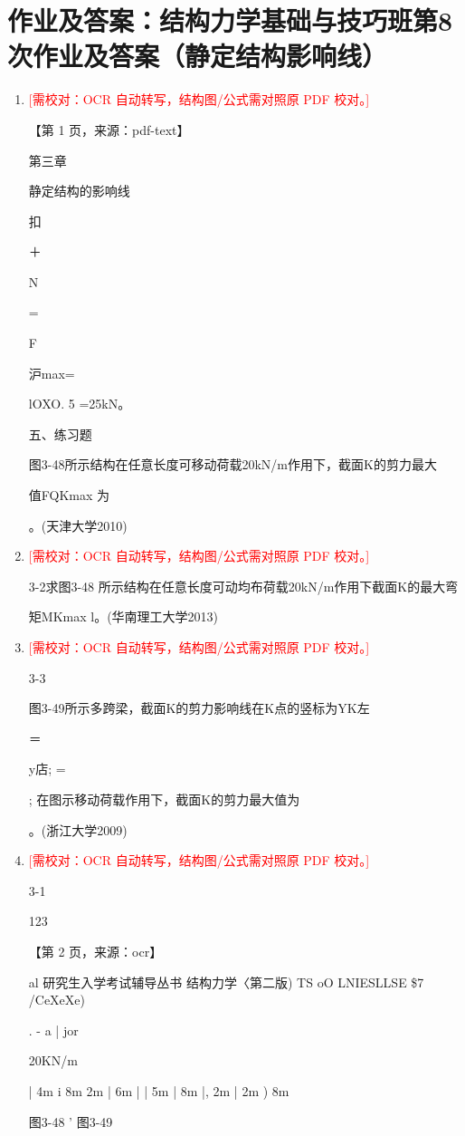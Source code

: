 \documentclass[UTF8,12pt,a4paper,openany]{ctexbook}
\newcommand{\TODO}[1]{\textcolor{red}{[需校对：#1]}}
\begin{document}
\section{作业及答案：结构力学基础与技巧班第8次作业及答案（静定结构影响线）}
\begin{enumerate}[label=\textbf{\arabic*.},leftmargin=2em]
\item \TODO{OCR 自动转写，结构图/公式需对照原 PDF 校对。}\par 【第 1 页，来源：pdf-text】\par 第三章\par 静定结构的影响线\par 扣\par ＋\par N\par =\par F\par 沪max=\par lOXO. 5 =25kN。\par 五、练习题\par 图3-48所示结构在任意长度可移动荷载20kN/m作用下，截面K的剪力最大\par 值FQKmax 为\par 。(天津大学2010)
\item \TODO{OCR 自动转写，结构图/公式需对照原 PDF 校对。}\par 3-2求图3-48 所示结构在任意长度可动均布荷载20kN/m作用下截面K的最大弯\par 矩MKmax l。(华南理工大学2013)
\item \TODO{OCR 自动转写，结构图/公式需对照原 PDF 校对。}\par 3-3\par 图3-49所示多跨梁，截面K的剪力影响线在K点的竖标为YK左\par ＝\par y店; =\par ; 在图示移动荷载作用下，截面K的剪力最大值为\par 。(浙江大学2009)
\item \TODO{OCR 自动转写，结构图/公式需对照原 PDF 校对。}\par 3-1\par 123\par \par 【第 2 页，来源：ocr】\par al 研究生入学考试辅导丛书 结构力学〈第二版)          TS oO LNIESLLSE \$7 /CeXeXe)\par .     -                    a | jor\par 20KN/m\par |  4m  i   8m 2m |   6m   |     |  5m  |   8m  |, 2m | 2m ) 8m\par 图3-48                         '     图3-49

\end{enumerate}
\end{document}
